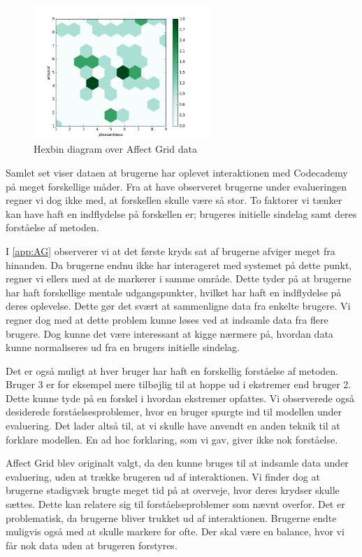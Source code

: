 \begin{figure}[h]
\centering
\includegraphics[width=0.6\textwidth]{hexbin.png}
\caption{Hexbin diagram over Affect Grid data}
\label{fig:hexbin}
\end{figure}

Samlet set viser dataen at brugerne har oplevet interaktionen med Codecademy på meget forskellige måder. Fra at have observeret brugerne under evalueringen regner vi dog ikke med, at forskellen skulle være så stor. To faktorer vi tænker kan have haft en indflydelse på forskellen er; brugeres initielle sindelag samt deres forståelse af metoden.

I \cref{app:AG} observerer vi at det første kryds sat af brugerne afviger meget fra hinanden. Da brugerne endnu ikke har interageret med systemet på dette punkt, regner vi ellers med at de markerer i samme område. Dette tyder på at brugerne har haft forskellige mentale udgangspunkter, hvilket har haft en indflydelse på deres oplevelse. Dette gør det svært at sammenligne data fra enkelte brugere. Vi regner dog med at dette problem kunne løses ved at indsamle data fra flere brugere. Dog kunne det være interessant at kigge nærmere på, hvordan data kunne normaliseres ud fra en brugers initielle sindelag.

Det er også muligt at hver bruger har haft en forskellig forståelse af metoden. Bruger 3 er for eksempel mere tilbøjlig til at hoppe ud i ekstremer end bruger 2. Dette kunne tyde på en forskel i hvordan ekstremer opfattes. Vi observerede også desiderede forståelsesproblemer, hvor en bruger spurgte ind til modellen under evaluering. Det lader altså til, at vi skulle have anvendt en anden teknik til at forklare modellen. En ad hoc forklaring, som vi gav, giver ikke nok forståelse. 

Affect Grid blev originalt valgt, da den kunne bruges til at indsamle data under evaluering, uden at trække brugeren ud af interaktionen. Vi finder dog at brugerne stadigvæk brugte meget tid på at overveje, hvor deres krydser skulle sættes. Dette kan relatere sig til forståelseproblemer som nævnt overfor. Det er problematisk, da brugerne bliver trukket ud af interaktionen. Brugerne endte muligvis også med at skulle markere for ofte. Der skal være en balance, hvor vi får nok data uden at brugeren forstyres. 

